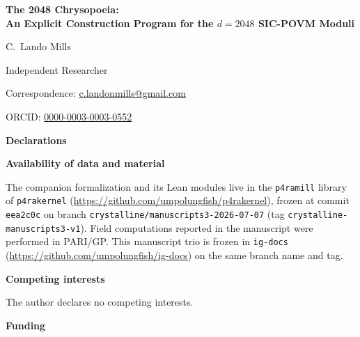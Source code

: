 \documentclass[12pt,a4paper]{article}
\begin{document}
\begin{center}

\vspace*{1.5em}

{\LARGE\bfseries The 2048 Chrysopoeia:\\[0.4em]
An Explicit Construction Program for the $d=2048$ SIC-POVM Moduli}

\vspace{1.5em}

{\large C.\ Lando Mills}

\vspace{0.6em}

{\normalsize Independent Researcher}

\vspace{0.4em}

{\normalsize Correspondence: \href{mailto:c.landonmills@gmail.com}{c.landonmills@gmail.com}}

\vspace{0.2em}

{\normalsize ORCID: \href{https://orcid.org/0000-0003-0003-0552}{0000-0003-0003-0552}}

\end{center}

\vspace{1.5em}

\noindent\textbf{Declarations}

\vspace{0.8em}

\noindent\textbf{Availability of data and material}

\noindent
The companion formalization and its Lean modules live in the \texttt{p4ramill} library of
\texttt{p4rakernel} (\url{https://github.com/umpolungfish/p4rakernel}), frozen at commit
\texttt{eea2c0c} on branch \texttt{crystalline/manuscripts3-2026-07-07}
(tag \texttt{crystalline-manuscripts3-v1}).
Field computations reported in the manuscript were performed in PARI/GP.
This manuscript trio is frozen in \texttt{ig-docs}
(\url{https://github.com/umpolungfish/ig-docs}) on the same branch name and tag.

\vspace{1em}

\noindent\textbf{Competing interests}

\noindent
The author declares no competing interests.

\vspace{1em}

\noindent\textbf{Funding}
\end{document}
